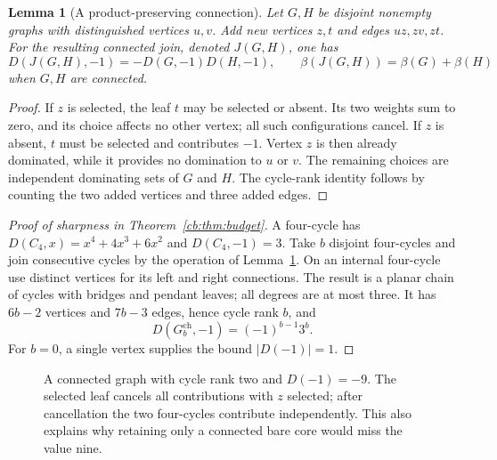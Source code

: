 \documentclass[11pt]{article}
\numberwithin{equation}{section}
\newtheorem{lemma}[theorem]{Lemma}
\theoremstyle{definition}
\begin{document}
\begin{lemma}[A product-preserving connection]\label{cb:lem:join}
Let $G,H$ be disjoint nonempty graphs with distinguished vertices $u,v$.
Add new vertices $z,t$ and edges $uz,zv,zt$. For the resulting connected
join, denoted $J(G,H)$, one has
\begin{equation}\label{cb:eq:join}
 D(J(G,H),-1)=-D(G,-1)D(H,-1),\qquad
 \beta(J(G,H))=\beta(G)+\beta(H)
\end{equation}
when $G,H$ are connected.
\end{lemma}
\begin{proof}
If $z$ is selected, the leaf $t$ may be selected or absent. Its two weights
sum to zero, and its choice affects no other vertex; all such configurations
cancel. If $z$ is absent, $t$ must be selected and contributes $-1$.
Vertex $z$ is then already dominated, while it provides no domination to
$u$ or $v$. The remaining choices are independent dominating sets of
$G$ and $H$. The cycle-rank identity follows by counting the two added
vertices and three added edges.
\end{proof}

\begin{proof}[Proof of sharpness in Theorem~\ref{cb:thm:budget}]
A four-cycle has $D(C_4,x)=x^4+4x^3+6x^2$ and $D(C_4,-1)=3$.
Take $b$ disjoint four-cycles and join consecutive cycles by the operation
of Lemma~\ref{cb:lem:join}. On an internal four-cycle use distinct vertices
for its left and right connections. The result is a planar chain of
cycles with bridges and pendant leaves; all degrees are at most three.
It has $6b-2$ vertices and $7b-3$ edges, hence cycle rank $b$, and
\[
 D(G^{\mathrm{ch}}_b,-1)=(-1)^{b-1}3^b.
\]
For $b=0$, a single vertex supplies the bound $|D(-1)|=1$.
\end{proof}

\begin{figure}[htbp]
\centering
{}
\caption{A connected graph with cycle rank two and $D(-1)=-9$. The selected
leaf cancels all contributions with $z$ selected; after cancellation the
two four-cycles contribute independently. This also explains why retaining
only a connected bare core would miss the value nine.}
\end{figure}
\end{document}
